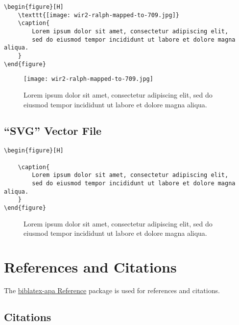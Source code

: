 \begin{lstlisting}[caption={Embedding a ``JPG'' raster file.}]
\begin{figure}[H]
    \texttt{[image: wir2-ralph-mapped-to-709.jpg]}
    \caption{
        Lorem ipsum dolor sit amet, consectetur adipiscing elit,
        sed do eiusmod tempor incididunt ut labore et dolore magna aliqua.
    }
\end{figure}
\end{lstlisting}

\begin{figure}[H]
    \texttt{[image: wir2-ralph-mapped-to-709.jpg]}
    \caption{
        Lorem ipsum dolor sit amet, consectetur adipiscing elit,
        sed do eiusmod tempor incididunt ut labore et dolore magna aliqua.
    }
\end{figure}

\subsection*{``SVG'' Vector File}

\begin{lstlisting}[caption={Embedding a ``SVG'' vector file.}]
\begin{figure}[H]
    
    \caption{
        Lorem ipsum dolor sit amet, consectetur adipiscing elit,
        sed do eiusmod tempor incididunt ut labore et dolore magna aliqua.
    }
\end{figure}
\end{lstlisting}

\begin{figure}[H]
    
    \caption{
        Lorem ipsum dolor sit amet, consectetur adipiscing elit,
        sed do eiusmod tempor incididunt ut labore et dolore magna aliqua.
    }
\end{figure}

\section*{References and Citations}

The \href{https://ctan.org/pkg/biblatex-apa}{biblatex-apa Reference}
package is used for references and citations.

\subsection*{Citations}

